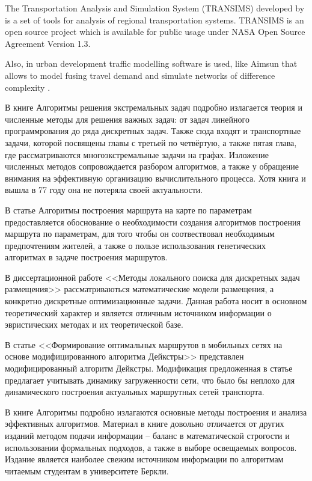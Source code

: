 The Transportation Analysis and Simulation System (TRANSIMS) developed by \cite{transims} is a set of 
tools for analysis of regional transportation systems. TRANSIMS is an open source project which is 
available for public usage under NASA Open Source Agreement Version 1.3.
 
Also, in urban development traffic modelling software is used, like Aimsun that allows to model fusing 
travel demand and simulate networks of difference complexity \cite{aimsun}.

В книге Алгоритмы решения экстремальных задач\cite{bib:56} подробно излагается теория и численные методы 
для решения важных задач: от задач линейного программрования до ряда дискретных задач. Также сюда входят 
и транспортные задачи, которой посвящены главы с третьей по четвёртую, а также пятая глава, где 
рассматриваются многоэкстремальные задачи на графах. Изложение численных методов сопровождается разбором 
алгоритмов, а также у обращение внимания на эффективную организацию вычислительного процесса. Хотя книга 
и вышла в 77 году она не потеряла своей актуальности.

В статье Алгоритмы построения маршрута на карте по параметрам\cite{bib:46} предоставляется обоснование 
о необходимости создания алгоритмов построения маршрута по параметрам, для того чтобы он соотвествовал 
необходимым предпочтениям жителей, а также о пользе использования генетических алгоритмах в задаче 
построения маршрутов.

В диссертационной работе <<Методы локального поиска для дискретных задач размещения>>\cite{bib:45} 
рассматриваються математические модели размещения, а конкретно дискретные оптимизационные задачи. Данная 
работа носит в основном теоретический характер и является отличным источником информации о эвристических 
методах и их теоретической базе.

В статье <<Формирование оптимальных маршрутов в мобильных сетях на основе модифицированного алгоритма 
Дейкстры>>\cite{bib:55} представлен модифицированный алгоритм Дейкстры. Модификация предложенная в статье 
предлагает учитывать динамику загруженности сети, что было бы неплохо для динамического построения 
актуальных маршрутных сетей транспорта.

В книге Алгоритмы\cite{bib:47} подробно излагаются основные методы построения и анализа эффективных 
алгоритмов. Материал в книге довольно отличается от других изданий методом подачи информации -- баланс в 
математической строгости и использовании формальных подходов, а также в выборе освещаемых вопросов. 
Издание является наиболее свежим источником информации по алгоритмам читаемым студентам в университете Беркли.

